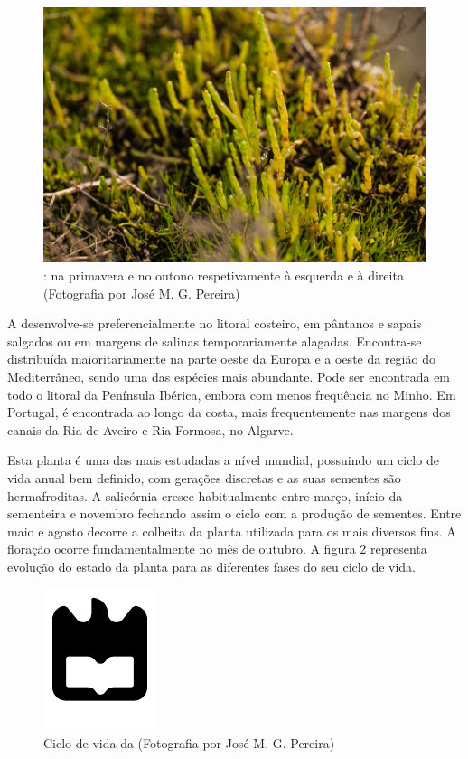 \newpage
\begin{figure}[!htb]
	\centering
	\includegraphics[scale=0.3]{img/cap2-sali/Salicornia04.JPG}
	\caption{\sr: na primavera e no outono respetivamente à esquerda e à direita (Fotografia por José M. G. Pereira)}
	\label{primoutono}
\end{figure}


A \sr desenvolve-se preferencialmente no litoral costeiro, em pântanos e sapais salgados ou em margens de salinas temporariamente alagadas. Encontra-se distribuída maioritariamente na parte oeste da Europa e a oeste da região do Mediterrâneo, sendo uma das espécies mais abundante\cite{Figueroa1987}. Pode ser encontrada em todo o litoral da Península Ibérica, embora com menos frequência no Minho\cite{Silva2000}. Em Portugal, é encontrada ao longo da costa, mais frequentemente nas margens dos canais da Ria de Aveiro e Ria Formosa, no Algarve\cite{RaquelPinto}. 

Esta planta é uma das mais estudadas a nível mundial\cite{Figueroa1987}, possuindo um ciclo de vida anual bem definido, com gerações discretas e as suas sementes são hermafroditas\cite{Silva2007}. A salicórnia cresce habitualmente entre março, início da sementeira e novembro fechando assim o ciclo com a produção de sementes. Entre maio  e agosto decorre a colheita da planta\cite{RaquelPinto} utilizada para os mais diversos fins. A floração ocorre fundamentalmente no mês de outubro\cite{Figueroa1987}. A figura \ref{ciclodevida} representa evolução do estado da planta para as diferentes fases do seu ciclo de vida. 




 \begin{figure}[!htb]
 	\centering
 	\includegraphics{uaLogoNew.pdf}
 	\caption{Ciclo de vida da \sr (Fotografia por José M. G. Pereira)}
 	\label{ciclodevida}
 \end{figure}
 
